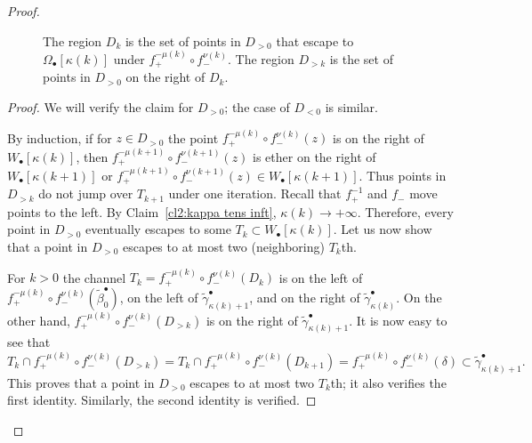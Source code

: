 \documentclass[]{amsart}
\newcommand\oseq{{\bullet}}
\newcommand\inn{{\Omega}}
\newcommand\wbeta{{\widetilde \beta}}
\newcommand\wgamma{{\widetilde \gamma}}
\theoremstyle{remark}
\numberwithin{equation}{section}
\theoremstyle{definition}
\begin{document}
\begin{proof}
\begin{figure}
{}
\caption{The region $D_k$ is the set of points in $D_{>0}$ that escape to $\inn_\oseq [\kappa(k)]$ under $f_{+}^ {-\mu(k)}\circ   f_{-}^ {\nu(k)}$. The region $D_{>k}$ is the set of points in $D_{>0}$ on the right of $D_k$.}\label{Fig:DkTk}
\end{figure}
\begin{proof}
We will verify the claim for $D_{>0}$; the case of $D_{<0}$ is similar.

 By induction, if for $z\in D_{>0}$ the point $f_{+}^ {-\mu(k)}\circ   f_{-}^ {\nu(k)}(z)$ is on the right of $W_\oseq[\kappa(k)]$, then $f_{+}^ {-\mu(k+1)}\circ   f_{-}^ {\nu(k+1)}(z)$ is ether on the right of $W_\oseq[\kappa(k+1)]$ or ${f_{+}^ {-\mu(k+1)}\circ   f_{-}^ {\nu(k+1)}(z)\in W_\oseq[\kappa(k+1)]}$. Thus points in $D_{>k}$ do not jump over $T_{k+1}$ under one iteration. Recall that $f_+^{-1}$ and $f_-$ move points to the left. By Claim~\ref{cl2:kappa tens inft}, $\kappa(k)\to +\infty$. Therefore, every point in $D_{>0}$ eventually escapes to some $T_k\subset W_\oseq[\kappa(k)].$ Let us now show that a point in $D_{>0}$ escapes to at most two (neighboring) $T_k$th.

For $k>0$ the channel $T_k= f_{+}^ {-\mu(k)}\circ   f_{-}^ {\nu(k)} (D_k) $ is on the left of $f_{+}^ {-\mu(k)}\circ   f_{-}^ {\nu(k)} (\wbeta^{\oseq}_0)$, on the left of $\wgamma^{\oseq}_{\kappa(k)+1}$, and on the right of
 $\wgamma^{\oseq}_{\kappa(k)}$. On the other hand,  $f_{+}^ {-\mu(k)}\circ   f_{-}^ {\nu(k)} (D_{>k})$ is on the right of $\wgamma^{\oseq}_{\kappa(k)+1}$. It is now easy to see that \[T_k\cap f_{+}^ {-\mu(k)}\circ   f_{-}^ {\nu(k)} (D_{>k}) = T_k\cap f_{+}^ {-\mu(k)}\circ   f_{-}^ {\nu(k)} (D_{k+1})=f_{+}^ {-\mu(k)}\circ   f_{-}^ {\nu(k)} (\delta)\subset \wgamma^\oseq_{\kappa(k)+1}.\]
This proves that a point in $D_{>0}$ escapes to at most two $T_k$th; it also verifies the first identity. Similarly, the second identity is verified.
\end{proof}



\end{proof}
\end{document}

